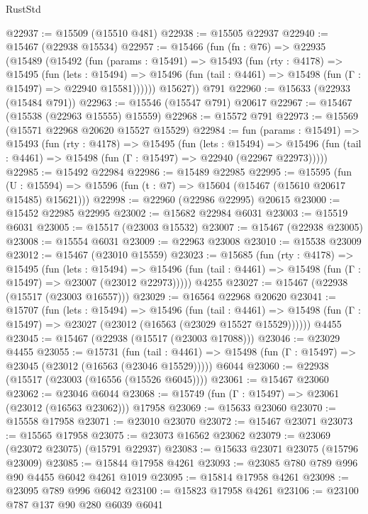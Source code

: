 \begin{lexlean}{RustStd}
\begin{coremodule}
@22937 := @15509 (@15510 @481)
@22938 := @15505 @22937
@22940 := @15467 (@22938 @15534)
@22957 := @15466
    (fun (fn : @76) =>
    @22935
      (@15489
        (@15492
          (fun (params : @15491) =>
          @15493
            (fun (rty : @4178) =>
            @15495
              (fun (lets : @15494) =>
              @15496 (fun (tail : @4461) => @15498 (fun (Γ : @15497) => @22940 @15581))))))
        @15627))
    @791
@22960 := @15633 (@22933 (@15484 @791))
@22963 := @15546 (@15547 @791) @20617
@22967 := @15467 (@15538 (@22963 @15555) @15559)
@22968 := @15572 @791
@22973 := @15569 (@15571 @22968 @20620 @15527 @15529)
@22984 := fun (params : @15491) =>
  @15493
    (fun (rty : @4178) =>
    @15495
      (fun (lets : @15494) =>
      @15496 (fun (tail : @4461) => @15498 (fun (Γ : @15497) => @22940 (@22967 @22973)))))
@22985 := @15492 @22984
@22986 := @15489 @22985
@22995 := @15595
    (fun (U : @15594) => @15596 (fun (t : @7) => @15604 (@15467 (@15610 @20617 @15485) @15621)))
@22998 := @22960 (@22986 @22995) @20615
@23000 := @15452 @22985 @22995
@23002 := @15682 @22984 @6031
@23003 := @15519 @6031
@23005 := @15517 (@23003 @15532)
@23007 := @15467 (@22938 @23005)
@23008 := @15554 @6031
@23009 := @22963 @23008
@23010 := @15538 @23009
@23012 := @15467 (@23010 @15559)
@23023 := @15685
    (fun (rty : @4178) =>
    @15495
      (fun (lets : @15494) =>
      @15496 (fun (tail : @4461) => @15498 (fun (Γ : @15497) => @23007 (@23012 @22973)))))
    @4255
@23027 := @15467 (@22938 (@15517 (@23003 @16557)))
@23029 := @16564 @22968 @20620
@23041 := @15707
    (fun (lets : @15494) =>
    @15496
      (fun (tail : @4461) =>
      @15498 (fun (Γ : @15497) => @23027 (@23012 (@16563 (@23029 @15527 @15529))))))
    @4455
@23045 := @15467 (@22938 (@15517 (@23003 @17088)))
@23046 := @23029 @4455
@23055 := @15731
    (fun (tail : @4461) => @15498 (fun (Γ : @15497) => @23045 (@23012 (@16563 (@23046 @15529)))))
    @6044
@23060 := @22938 (@15517 (@23003 (@16556 (@15526 @6045))))
@23061 := @15467 @23060
@23062 := @23046 @6044
@23068 := @15749 (fun (Γ : @15497) => @23061 (@23012 (@16563 @23062))) @17958
@23069 := @15633 @23060
@23070 := @15558 @17958
@23071 := @23010 @23070
@23072 := @15467 @23071
@23073 := @15565 @17958
@23075 := @23073 @16562 @23062
@23079 := @23069 (@23072 @23075) (@15791 @22937)
@23083 := @15633 @23071 @23075 (@15796 @23009)
@23085 := @15844 @17958 @4261
@23093 := @23085 @780 @789 @996 @90 @4455 @6042 @4261 @1019
@23095 := @15814 @17958 @4261
@23098 := @23095 @789 @996 @6042
@23100 := @15823 @17958 @4261
@23106 := @23100 @787 @137 @90 @280 @6039 @6041

\end{coremodule}
\end{lexlean}

